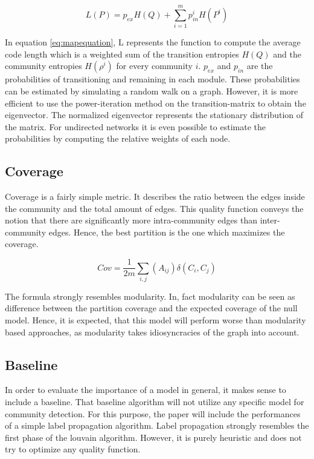 \documentclass[11pt, twocolumn]{article}
\begin{document}
\begin{equation}
    \label{eq:mapequation}
    L(P) = p_{ex} H(Q) + \sum_{i=1}^m p_{in}^iH(P^i)
\end{equation}

In equation \autoref{eq:mapequation}, L represents the function to compute the average code length which is a weighted sum of the transition entropies $H(Q)$ and the community entropies $H(\rho^i)$ for every community $i$. $p_{ex}$ and $p_{in}$ are the probabilities of transitioning and remaining in each module. These probabilities can be estimated by simulating a random walk on a graph. However, it is more efficient to use the power-iteration method on the transition-matrix to obtain the eigenvector. The normalized eigenvector represents the stationary distribution of the matrix. For undirected networks it is even possible to estimate the probabilities by computing the relative weights of each node.            

\subsection{Coverage}
Coverage is a fairly simple metric. It describes the ratio between the edges inside the community and the total amount of edges.\cite{fortunato_CommunityDetectionGraphs_2010} This quality function conveys the notion that there are significantly more intra-community edges than inter-community edges. Hence, the best partition is the one which maximizes the coverage. 

\begin{equation}
    Cov = \frac{1}{2m}\sum_{i,j}(A_{ij})\delta(C_i,C_j)
\end{equation}

The formula strongly resembles modularity. In, fact modularity can be seen as difference between the partition coverage and the expected coverage of the null model. Hence, it is expected, that this model will perform worse than modularity based approaches, as modularity takes idiosyncracies of the graph into account.

\subsection{Baseline}
In order to evaluate the importance of a model in general, it makes sense to include a baseline. That baseline algorithm will not utilize any specific model for community detection. For this purpose, the paper will include the performances of a simple label propagation algorithm. Label propagation strongly resembles the first phase of the louvain algorithm. However, it is purely heuristic and does not try to optimize any quality function.  
\end{document}
